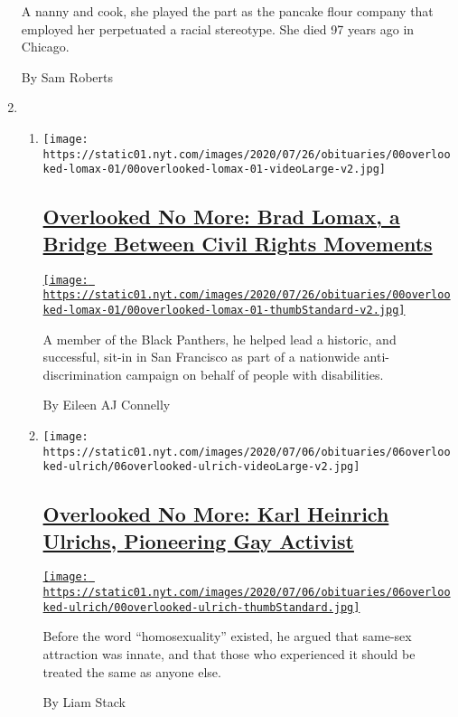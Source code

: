 \begin{enumerate}
  A nanny and cook, she played the part as the pancake flour company
  that employed her perpetuated a racial stereotype. She died 97 years
  ago in Chicago.

  By Sam Roberts
\item
  \begin{enumerate}
  \def\labelenumii{\arabic{enumii}.}
  \item
    \texttt{[image: https://static01.nyt.com/images/2020/07/26/obituaries/00overlooked-lomax-01/00overlooked-lomax-01-videoLarge-v2.jpg]}

    \hypertarget{overlooked-no-more-brad-lomax-a-bridge-between-civil-rights-movements}{%
    \subsection{\texorpdfstring{\href{/2020/07/08/obituaries/brad-lomax-overlooked.html}{Overlooked
    No More: Brad Lomax, a Bridge Between Civil Rights
    Movements}}{Overlooked No More: Brad Lomax, a Bridge Between Civil Rights Movements}}\label{overlooked-no-more-brad-lomax-a-bridge-between-civil-rights-movements}}

    \href{/2020/07/08/obituaries/brad-lomax-overlooked.html}{\texttt{[image: https://static01.nyt.com/images/2020/07/26/obituaries/00overlooked-lomax-01/00overlooked-lomax-01-thumbStandard-v2.jpg]}}

    A member of the Black Panthers, he helped lead a historic, and
    successful, sit-in in San Francisco as part of a nationwide
    anti-discrimination campaign on behalf of people with disabilities.

    By Eileen AJ Connelly
  \item
    \texttt{[image: https://static01.nyt.com/images/2020/07/06/obituaries/06overlooked-ulrich/06overlooked-ulrich-videoLarge-v2.jpg]}

    \hypertarget{overlooked-no-more-karl-heinrich-ulrichs-pioneering-gay-activist}{%
    \subsection{\texorpdfstring{\href{/2020/07/01/obituaries/karl-heinrich-ulrichs-overlooked.html}{Overlooked
    No More: Karl Heinrich Ulrichs, Pioneering Gay
    Activist}}{Overlooked No More: Karl Heinrich Ulrichs, Pioneering Gay Activist}}\label{overlooked-no-more-karl-heinrich-ulrichs-pioneering-gay-activist}}

    \href{/2020/07/01/obituaries/karl-heinrich-ulrichs-overlooked.html}{\texttt{[image: https://static01.nyt.com/images/2020/07/06/obituaries/06overlooked-ulrich/00overlooked-ulrich-thumbStandard.jpg]}}

    Before the word ``homosexuality'' existed, he argued that same-sex
    attraction was innate, and that those who experienced it should be
    treated the same as anyone else.

    By Liam Stack
  \end{enumerate}
\end{enumerate}

